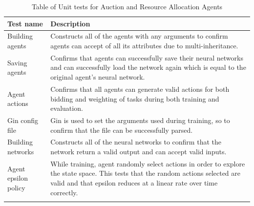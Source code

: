 \begin{longtable}{|p{3cm}|p{11cm}|} \hline
    \textbf{Test name} & \textbf{Description} \\ \hline
    Building agents & Constructs all of the agents with any arguments to confirm agents can accept of all its
        attributes due to multi-inheritance. \\ \hline
    Saving agents & Confirms that agents can successfully save their neural networks and can successfully load
        the network again which is equal to the original agent's neural network. \\ \hline
    Agent actions & Confirms that all agents can generate valid actions for both bidding and weighting of tasks during
        both training and evaluation. \\ \hline
    Gin config file & Gin is used to set the arguments used during training, so to confirm that the file can be
        successfully parsed. \\ \hline
    Building networks & Constructs all of the neural networks to confirm that the network return a valid output
        and can accept valid inputs. \\ \hline
    Agent epsilon policy & While training, agent randomly select actions in order to explore the state space.
        This tests that the random actions selected are valid and that epsilon reduces at a linear rate over time
        correctly. \\ \hline
    \caption{Table of Unit tests for Auction and Resource Allocation Agents}
    \label{tab:agent_testing}
\end{longtable}

